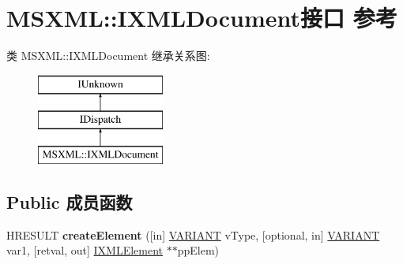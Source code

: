 \hypertarget{interface_m_s_x_m_l_1_1_i_x_m_l_document}{}\section{M\+S\+X\+ML\+:\+:I\+X\+M\+L\+Document接口 参考}
\label{interface_m_s_x_m_l_1_1_i_x_m_l_document}
类 M\+S\+X\+ML\+:\+:I\+X\+M\+L\+Document 继承关系图\+:\begin{figure}[H]
\begin{center}
\leavevmode
\includegraphics[height=3.000000cm]{interface_m_s_x_m_l_1_1_i_x_m_l_document}
\end{center}
\end{figure}
\subsection*{Public 成员函数}
\begin{DoxyCompactItemize}
\item 
\mbox{\label{interface_m_s_x_m_l_1_1_i_x_m_l_document_ada444190b46c436391476010c730dc8d}} 
H\+R\+E\+S\+U\+LT {\bfseries create\+Element} (\mbox{[}in\mbox{]} \hyperlink{structtag_v_a_r_i_a_n_t}{V\+A\+R\+I\+A\+NT} v\+Type, \mbox{[}optional, in\mbox{]} \hyperlink{structtag_v_a_r_i_a_n_t}{V\+A\+R\+I\+A\+NT} var1, \mbox{[}retval, out\mbox{]} \hyperlink{interface_m_s_x_m_l_1_1_i_x_m_l_element}{I\+X\+M\+L\+Element} $\ast$$\ast$pp\+Elem)
\end{DoxyCompactItemize}
